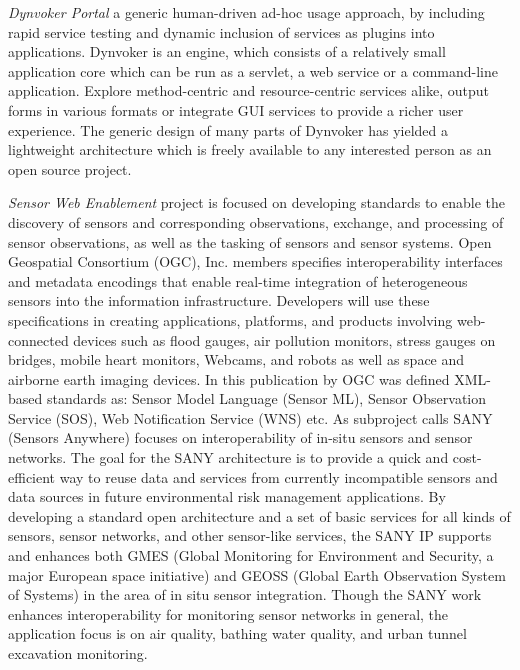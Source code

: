 	\emph{Dynvoker Portal}\cite{spillner2008ad} a generic human-driven ad-hoc usage approach, by including rapid service testing and dynamic inclusion of services as plugins into applications. Dynvoker is an engine, which consists of a relatively small application core which can be run as a servlet, a web service or a command-line application. Explore method-centric and resource-centric services alike, output forms in various formats or integrate GUI services to provide a richer user experience. The generic design of many parts of Dynvoker has yielded a lightweight architecture which is freely available to any interested person as an open source project.

	\emph{Sensor Web Enablement} project\cite{ogc} is focused on developing standards to enable the discovery of sensors and corresponding observations, exchange, and processing of sensor observations, as well as the tasking of sensors and sensor systems. Open Geospatial Consortium (OGC), Inc. members specifies interoperability interfaces and metadata encodings that enable real-time integration of heterogeneous sensors into the information infrastructure. Developers will use these specifications in creating applications, platforms, and products involving web-connected devices such as flood gauges, air pollution monitors, stress gauges on bridges, mobile heart monitors, Webcams, and robots as well as space and airborne earth imaging devices. In this publication by OGC was defined XML-based standards as: Sensor Model Language (Sensor ML), Sensor Observation Service (SOS), Web Notification Service (WNS) etc. As subproject calls SANY (Sensors Anywhere) focuses on interoperability of in-situ sensors and sensor networks. The goal for the SANY architecture is to provide a quick and cost-efficient way to reuse data and services from currently incompatible sensors and data sources in future environmental risk management applications. By developing a standard open architecture and a set of basic services for all kinds of sensors, sensor networks, and other sensor-like services, the SANY IP supports and enhances both GMES (Global Monitoring for Environment and Security, a major European space initiative) and GEOSS (Global Earth Observation System of Systems) in the area of in situ sensor integration. Though the SANY work enhances interoperability for monitoring sensor networks in general, the application focus is on air quality, bathing water quality, and urban tunnel excavation monitoring.
 
